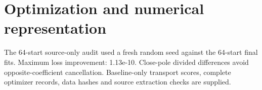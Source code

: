 \documentclass[11pt,a4paper]{article}
\begin{document}
\section{Optimization and numerical representation}
The 64-start source-only audit used a fresh random seed against the 64-start final fits. Maximum loss improvement: 1.13e-10. Close-pole divided differences avoid opposite-coefficient cancellation. Baseline-only transport scores, complete optimizer records, data hashes and source extraction checks are supplied.

\begingroup\fontsize{8.5}{9.6}\selectfont\setlength{\parskip}{0pt}\setlength{\bibsep}{0pt}\endgroup
\end{document}
